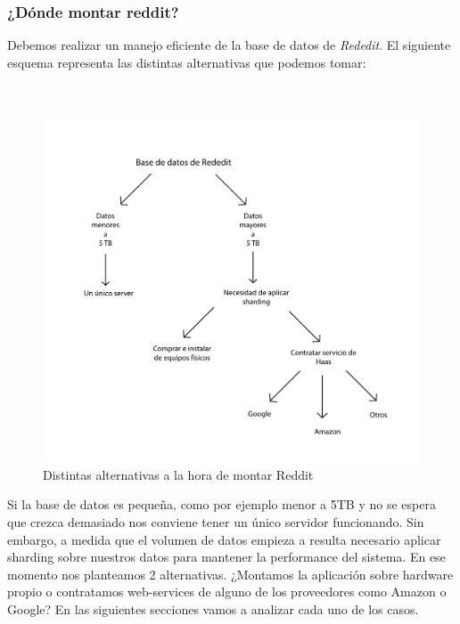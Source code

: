 

\subsubsection{¿Dónde montar reddit?}

Debemos realizar un manejo eficiente de la base de datos de \emph{Rededit}. El siguiente esquema representa las distintas
alternativas que podemos tomar:

~

\begin{figure}[!h]
	\begin{center}
		  \includegraphics[keepaspectratio]{imagenes/im_1.pdf}
		  \caption{Distintas alternativas a la hora de montar Reddit}
		  \label{fig:contra1}
	\end{center}
\end{figure}
\FloatBarrier

Si la base de datos es peque\~na, como por ejemplo menor a 5TB y no se espera que crezca demasiado
nos conviene tener un único servidor funcionando. Sin embargo, a medida que el volumen de datos
empieza a resulta necesario aplicar sharding sobre nuestros datos para mantener la performance del sistema. En ese
momento nos planteamos 2 alternativas. ¿Montamos la aplicación sobre hardware propio o contratamos web-services 
de alguno de los proveedores como Amazon o Google? En las siguientes secciones vamos a analizar cada uno de los casos.

